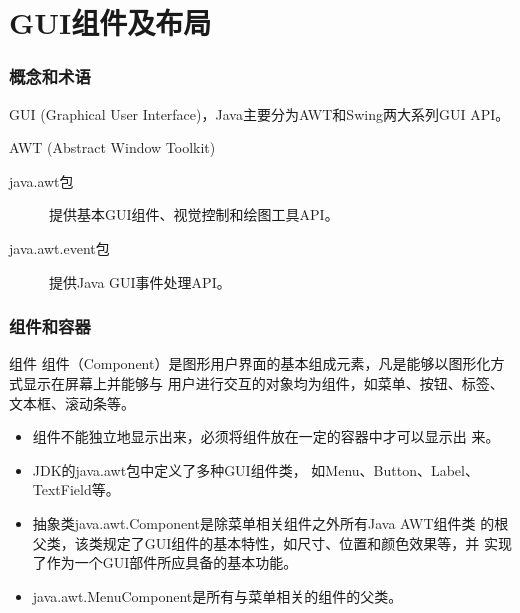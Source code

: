 \section{GUI组件及布局}

\begin{frame}[fragile] %
  \frametitle{概念和术语}


  GUI (Graphical User Interface)，Java主要分为AWT和Swing两大系列GUI API。


  AWT (Abstract Window Toolkit)


  \begin{description}
  \item[java.awt包] 提供基本GUI组件、视觉控制和绘图工具API。
  \item[java.awt.event包] 提供Java GUI事件处理API。
  \end{description}
\end{frame}

\begin{frame}[fragile] %
  \frametitle{组件和容器}
  
  \begin{block}{组件}
    组件（Component）是图形用户界面的基本组成元素，凡是能够以图形化方式显示在屏幕上并能够与
    用户进行交互的对象均为组件，如菜单、按钮、标签、文本框、滚动条等。
  \end{block}

  \pause
  
  \begin{itemize}[<+-|alert@+>]\kai
  \item 组件不能独立地显示出来，必须将组件放在一定的容器中才可以显示出
    来。
  \item JDK的java.awt包中定义了多种GUI组件类，
    如Menu、Button、Label、TextField等。
  \item 抽象类java.awt.Component是除菜单相关组件之外所有Java AWT组件类
    的根父类，该类规定了GUI组件的基本特性，如尺寸、位置和颜色效果等，并
    实现了作为一个GUI部件所应具备的基本功能。
  \item java.awt.MenuComponent是所有与菜单相关的组件的父类。
  \end{itemize}
\end{frame}

